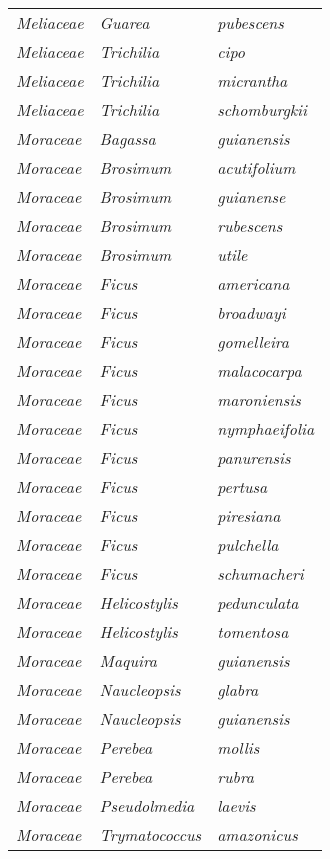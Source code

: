 \documentclass[fleqn,10pt]{ArtEcoFoG} %
\renewenvironment{table}{\begin{table*}}{\end{table*}\ignorespacesafterend}
\begin{document}
\begin{table}
\begin{tabular}[t]{lll}
\em{Meliaceae} & \em{Guarea} & \em{pubescens}\\
\em{Meliaceae} & \em{Trichilia} & \em{cipo}\\
\em{Meliaceae} & \em{Trichilia} & \em{micrantha}\\
\em{Meliaceae} & \em{Trichilia} & \em{schomburgkii}\\
\em{Moraceae} & \em{Bagassa} & \em{guianensis}\\
\addlinespace
\em{Moraceae} & \em{Brosimum} & \em{acutifolium}\\
\em{Moraceae} & \em{Brosimum} & \em{guianense}\\
\em{Moraceae} & \em{Brosimum} & \em{rubescens}\\
\em{Moraceae} & \em{Brosimum} & \em{utile}\\
\em{Moraceae} & \em{Ficus} & \em{americana}\\
\addlinespace
\em{Moraceae} & \em{Ficus} & \em{broadwayi}\\
\em{Moraceae} & \em{Ficus} & \em{gomelleira}\\
\em{Moraceae} & \em{Ficus} & \em{malacocarpa}\\
\em{Moraceae} & \em{Ficus} & \em{maroniensis}\\
\em{Moraceae} & \em{Ficus} & \em{nymphaeifolia}\\
\addlinespace
\em{Moraceae} & \em{Ficus} & \em{panurensis}\\
\em{Moraceae} & \em{Ficus} & \em{pertusa}\\
\em{Moraceae} & \em{Ficus} & \em{piresiana}\\
\em{Moraceae} & \em{Ficus} & \em{pulchella}\\
\em{Moraceae} & \em{Ficus} & \em{schumacheri}\\
\addlinespace
\em{Moraceae} & \em{Helicostylis} & \em{pedunculata}\\
\em{Moraceae} & \em{Helicostylis} & \em{tomentosa}\\
\em{Moraceae} & \em{Maquira} & \em{guianensis}\\
\em{Moraceae} & \em{Naucleopsis} & \em{glabra}\\
\em{Moraceae} & \em{Naucleopsis} & \em{guianensis}\\
\addlinespace
\em{Moraceae} & \em{Perebea} & \em{mollis}\\
\em{Moraceae} & \em{Perebea} & \em{rubra}\\
\em{Moraceae} & \em{Pseudolmedia} & \em{laevis}\\
\em{Moraceae} & \em{Trymatococcus} & \em{amazonicus}\\

\end{tabular}
\end{table}
\end{document}

